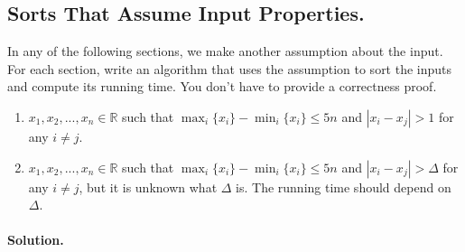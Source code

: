  \subsection{Sorts That Assume Input Properties.}
 In any of the following sections, we make another assumption about the input. For each section, write an algorithm that uses the assumption to sort the inputs and compute its running time. You don't have to provide a correctness proof.
 \begin{enumerate} 
   \item $x_{1},x_{2},...,x_{n} \in \mathbb{R}$ such that $\max_{i} \{x_{i}\} - \min_{i} \{x_{i}\} \leq 5n$ and $|x_{i} - x_{j}| > 1$ for any $i \neq j$.
   \item $x_1, x_2, ..., x_n \in \mathbb{R}$ such that $\max_{i} \{x_{i}\} -\min_{i} \{x_{i}\} \leq 5n$ and $|x_{i} - x_{j}| > \Delta$ for any $i \neq j$, but it is unknown what $\Delta$ is. The running time should depend on $\Delta$.
 \end{enumerate}
\ifdefined\SOLUTION

  \paragraph{Solution.} \\

